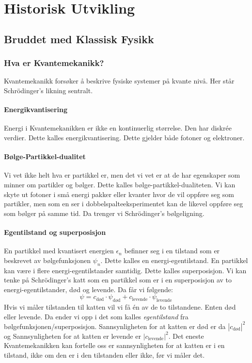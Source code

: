 \part{Historisk Utvikling}
\chapter{Bruddet med Klassisk Fysikk}
\section{Hva er Kvantemekanikk?} 
Kvantemekanikk forsøker å beskrive fysiske systemer på kvante nivå. Her står Schrödinger's likning sentralt. 

\subsection{Energikvantisering}
Energi i Kvantemekanikken er ikke en kontinuerlig størrelse. Den har diskrée verdier. Dette kalles energikvantisering. Dette gjelder både fotoner og elektroner. 

\subsection{Bølge-Partikkel-dualitet}
Vi vet ikke helt hva er partikkel er, men det vi vet er at de har egenskaper som minner om partikler og bølger. Dette kalles bølge-partikkel-dualiteten. Vi kan skyte ut fotoner i små energi pakker eller kvanter hvor de vil oppføre seg som partikler, men som en ser i dobbelspalteeksperimentet kan de likevel oppføre seg som bølger på samme tid. Da trenger vi Schrödinger's bølgeligning.

\subsection{Egentilstand og superposisjon}
En partikkel med kvantisert energien $ ϵ_{n} $ befinner seg i en tilstand som er beskrevet av bølgefunksjonen $ ψ_{n} $. Dette kalles en energi-egentilstand. En partikkel kan være i flere energi-egentilstander samtidig. Dette kalles superposisjon. Vi kan tenke på Schrödinger's katt som en partikkel som er i en superposisjon av to energi-egentilstander, død og levende. Da får vi følgende:
\begin{equation}
ψ = c_{\text{død}} ⋅ ψ_{\text{død}} + c_{\text{levende}} ⋅ ψ_{\text{levende}}
\end{equation}
Hvis vi måler tilstanden til katten vil vi få én av de to tilstandene. Enten død eller levende. Da ender vi opp i det som kalles \textit{egentilstand} fra bølgefunksjonen/superposisjon. Sannsynligheten for at katten er død er da $ \left\vert c_{\text{død}} \right\vert ^{2} $ og Sannsynligheten for at katten er levende er $ \left\vert c_{\text{levende}} \right\vert ^{2} $. Det eneste Kvantemekanikken kan fortelle oss er sannsynligheten for at katten er i en tilstand, ikke om den er i den tilstanden eller ikke, før vi måler det. 

